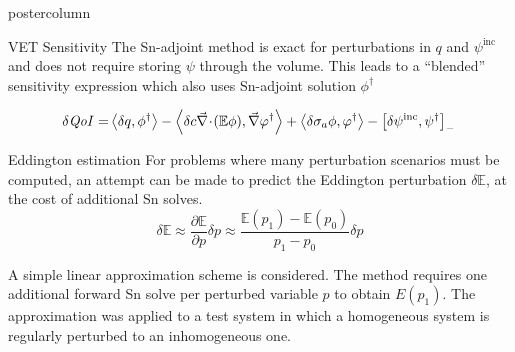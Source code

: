 \documentclass[xcolor={usenames,dvipsnames,svgnames,table}]{beamer}
\newcommand{\bra}{\left\langle}
\newcommand{\ket}{\right\rangle}
\newcommand{\sbra}{\left[}
\newcommand{\sket}{\right]}
\newcommand{\Edd}{\mathbb{E}}
\newcommand{\isigt}{c}
\newcommand{\qoi}{{\it QoI}\xspace}
\begin{document}
\begin{frame}
\begin{columns}
\begin{column}{.33\textwidth}
\begin{beamercolorbox}[center,wd=\textwidth]{postercolumn}
\begin{minipage}[T]{0.95\textwidth}
{\begin{block}{VET Sensitivity}
The Sn-adjoint method is exact for perturbations in $q$ and $\psi^\text{inc}$ and does not require storing $\psi$ through the volume. This leads to a ``blended'' sensitivity expression which also uses Sn-adjoint solution $\phi^\dag$

\begin{equation}
\label{SensIP2}
\begin{split}
\delta \qoi =&  \bra \delta q , \phi^\dag \ket - \bra \delta \isigt \div (\Edd \phi), \grad \varphi^\dag \ket + \bra \delta \sigma_a \phi, \varphi^\dag \ket \\
\end{split} - \sbra \delta \psi^{\text{inc}}, \psi^\dag \sket_- \,
\end{equation}


			    \end{block}
			    \vfill
			    \begin{block}{Eddington estimation}
			    For problems where many perturbation scenarios must be computed, an attempt can be made to predict the Eddington perturbation $\delta \Edd$, at the cost of additional Sn solves. 
\begin{equation}
	\delta \Edd \approx \frac{\partial \Edd}{\partial p} \delta p \approx \frac{\Edd(p_1) - \Edd(p_0)}{p_1 - p_0} \delta p	     
\end{equation}

A simple linear approximation scheme is considered. The method requires one additional forward Sn solve per perturbed variable $p$ to obtain $E(p_1)$.	
The approximation was applied to a test system in which a homogeneous system is regularly perturbed to an inhomogeneous one.


\end{block}}
\end{minipage}
\end{beamercolorbox}
\end{column}
\end{columns}
\end{frame}
\end{document}
